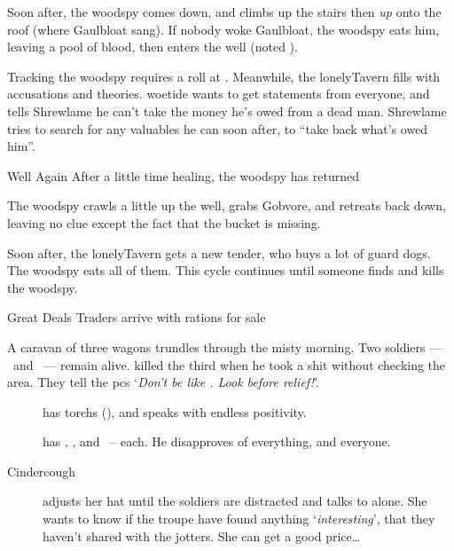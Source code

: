 \documentclass[10pt,twoside]{book}
\begin{document}
\setcounter{wounds}{3}
\woodspy

Soon after, the \gls{woodspy} comes down, and climbs up the stairs then \emph{up} onto the roof (where Gaulbloat sang).
If nobody woke Gaulbloat, the \gls{woodspy} eats him, leaving a pool of blood, then enters the well (noted ).

Tracking the \gls{woodspy} requires a  roll at \tn[10].
Meanwhile, the \gls{lonelyTavern} fills with accusations and theories.
\Gls{woetide} wants to get statements from everyone, and tells Shrewlame he can't take the money he's owed from a dead man.
Shrewlame tries to search for any valuables he can soon after, to ``take back what's owed him''.

{Well Again}%
{After a little time healing, the \gls{woodspy} has returned}%

The \gls{woodspy} crawls a little up the well, grabs Gobvore, and retreats back down, leaving no clue except the fact that the bucket is missing.

Soon after, the \gls{lonelyTavern} gets a new \gls{tender}, who buys a lot of guard dogs.
The \gls{woodspy} eats all of them.
This cycle continues until someone finds and kills the \gls{woodspy}.

\null


{Great Deals}%
{Traders arrive with \glspl{ration} for sale}%

A caravan of three wagons trundles through the misty morning.
Two \glspl{soldier} --- \composeHumanName\ and \composeHumanName\ --- remain alive.
 killed the third when he took a shit without checking the area.
They tell the \glspl{pc} `\textit{Don't be like \composeHumanName.  Look before relief!}'.

\begin{description}
  \item[\composeHumanName]
  has \glspl{torch} (), and speaks with endless positivity.
  \item[\composeHumanName]
  has \rations, \rations, and \rations\ --  each.
  He disapproves of everything, and everyone.
  \item[Cindercough]
  adjusts her hat until the \glspl{soldier} are distracted and talks to  alone.
  She wants to know if the troupe have found anything `\emph{interesting}', that they haven't shared with the \glspl{jotter}.
  She can get a good price\ldots
\end{description}
\end{document}
